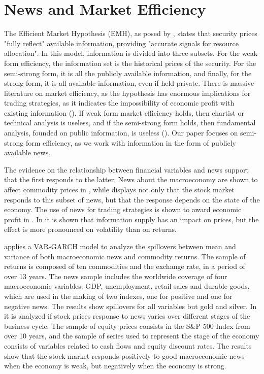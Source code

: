 \documentclass[cic,tc, english]{iiufrgs}
\begin{document}
\chapter{News and Market Efficiency} \label{chapter_literature}

    The Efficient Market Hypothesis (EMH), as posed by \citet{fama1970}, states that security prices "fully reflect" available information, providing "accurate signals for resource allocation". In this model, information is divided into three subsets. For the weak form efficiency, the information set is the historical prices of the security. For the semi-strong form, it is all the publicly available information, and finally, for the strong form, it is all available information, even if held private. There is massive literature on market efficiency, as the hypothesis has enormous implications for trading strategies, as it indicates the impossibility of economic profit with existing information (\citet{kamal2014}). If weak form market efficiency holds, then chartist or technical analysis is useless, and if the semi-strong form holds, then fundamental analysis, founded on public information, is useless (\citet{oprean2012}). Our paper focuses on semi-strong form efficiency, as we work with information in the form of publicly available news.

    The evidence on the relationship between financial variables and news support that the first responds to the latter. News about the macroeconomy are shown to affect commodity prices in \citet{caporaleetal2015}, while \citet{macqueenroley1993} displays not only that the stock market responds to this subset of news, but that the response depends on the state of the economy. The use of news for trading strategies is shown to award economic profit in \citet{larsenthorsrud2017}. In \citet{moussaetal2017} it is shown that information supply has an impact on prices, but the effect is more pronounced on volatility than on returns.

    \citet{caporaleetal2015} applies a VAR-GARCH model to analyze the spillovers between mean and variance of both macroeconomic news and commodity returns. The sample of returns is composed of ten commodities and the exchange rate, in a period of over 13 years. The news sample includes the worldwide coverage of four macroeconomic variables: GDP, unemployment, retail sales and durable goods, which are used in the making of two indexes, one for positive and one for negative news. The results show spillovers for all variables but gold and silver.
    In \citet{macqueenroley1993} it is analyzed if stock prices response to news varies over different stages of the business cycle. The sample of equity prices consists in the S\&P 500 Index from over 10 years, and the sample of series used to represent the stage of the economy consists of variables related to cash flows and equity discount rates. The results show that the stock market responds positively to good macroeconomic news when the economy is weak, but negatively when the economy is strong.
\end{document}
